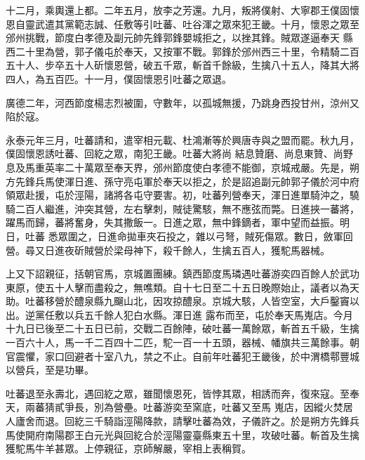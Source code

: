 \begin{pinyinscope}
 十二月，乘輿還上都。二年五月，放李之芳還。九月，叛將僕射、大寧郡王僕固懷恩自靈武遣其黨範志誠、任敷等引吐蕃、吐谷渾之眾來犯王畿。十月，懷恩之眾至邠州挑戰，節度白孝德及副元帥先鋒郭鋒嬰城拒之，以挫其鋒。賊眾遂逼奉天
 縣西二十里為營，郭子儀屯於奉天，又按軍不戰。郭鋒於邠州西三十里，令精騎二百五十人、步卒五十人斫懷恩營，破五千眾，斬首千餘級，生擒八十五人，降其大將四人，為五百匹。十一月，僕固懷恩引吐蕃之眾退。



 廣德二年，河西節度楊志烈被圍，守數年，以孤城無援，乃跳身西投甘州，涼州又陷於寇。



 永泰元年三月，吐蕃請和，遣宰相元載、杜鴻漸等於興唐寺與之盟而罷。秋九月，僕固懷恩誘吐蕃、回紇之眾，南犯王畿。吐蕃大將尚
 結息贊磨、尚息東贊、尚野息及馬重英率二十萬眾至奉天界，邠州節度使白孝德不能御，京城戒嚴。先是，朔方先鋒兵馬使渾日進、孫守亮屯軍於奉天以拒之，於是詔追副元帥郭子儀於河中府領眾赴援，屯於涇陽，諸將各屯守要害。初，吐蕃列營奉天，渾日進單騎沖之，驍騎二百人繼進，沖突其營，左右擊刺，賊徒驚駭，無不應弦而斃。日進挾一蕃將，躍馬而歸，蕃將奮身，失其撒飯一。日進之眾，無中鋒鏑者，軍中望而益振。明日，吐蕃
 悉眾圍之，日進命拋車夾石投之，雜以弓弩，賊死傷眾。數日，斂軍回營。尋又日進夜斫賊營於梁母神下，殺千餘人，生擒五百人，獲駝馬器械。



 上又下詔親征，括朝官馬，京城置團練。鎮西節度馬璘遇吐蕃游奕四百餘人於武功東原，使五十人擊而盡殺之，無噍類。自十七日至二十五日晚際始止，議者以為天助。吐蕃移營於醴泉縣九飀山北，因攻掠醴泉。京城大駭，人皆空室，大戶鑿竇以出。逆黨任敷以兵五千餘人犯白水縣。渾日進
 露布而至，屯於奉天馬嵬店。今月十九日已後至二十五日已前，交戰二百餘陣，破吐蕃一萬餘眾，斬首五千級，生擒一百六十人，馬一千二百四十二匹，駝一百一十五頭，器械、幡旗共三萬餘事。朝官震懼，家口回避者十室八九，禁之不止。自前年吐蕃犯王畿後，於中渭橋鄠豐城以營兵，至是功畢。



 吐蕃退至永壽北，遇回紇之眾，雖聞懷恩死，皆悖其眾，相誘而奔，復來寇。至奉天，兩蕃猜貳爭長，別為營壘。吐蕃游奕至窯底，吐蕃又至馬
 嵬店，因縱火焚居人廬舍而退。回紇三千騎詣涇陽降款，請擊吐蕃為效，子儀許之。於是朔方先鋒兵馬使開府南陽郡王白元光與回紇合於涇陽靈臺縣東五十里，攻破吐蕃。斬首及生擒獲駝馬牛羊甚眾。上停親征，京師解嚴，宰相上表稱賀。



\end{pinyinscope}